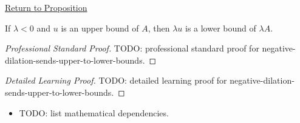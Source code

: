 \newpage
{}
\label{prf:negative-dilation-sends-upper-to-lower-bounds}

\begin{remark*}[Return]
\hyperref[prop:negative-dilation-sends-upper-to-lower-bounds]{Return to Proposition}
\end{remark*}

\begin{proposition*}
If $\lambda<0$ and $u$ is an upper bound of $A$, then $\lambda u$ is a lower
bound of $\lambda A$.
\end{proposition*}

\begin{proof}[Professional Standard Proof]
\LRAProofBodyStart
TODO: professional standard proof for negative-dilation-sends-upper-to-lower-bounds.
\end{proof}

\begin{proof}[Detailed Learning Proof]
\LRAProofBodyStart
TODO: detailed learning proof for negative-dilation-sends-upper-to-lower-bounds.
\end{proof}

\begin{remark*}
\end{remark*}

\begin{dependencies}
\begin{itemize}
  \item TODO: list mathematical dependencies.
\end{itemize}
\end{dependencies}

\clearpage
